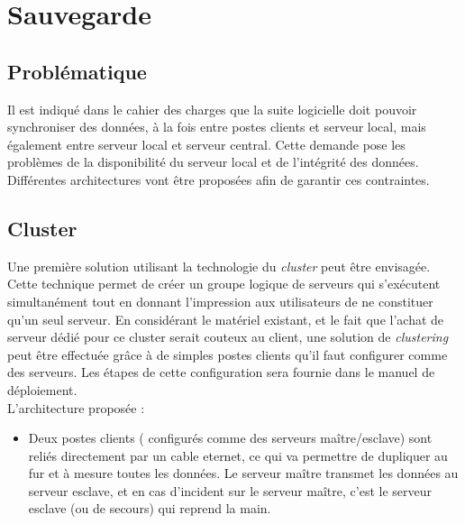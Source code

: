 \section{Sauvegarde}

% 

\subsection{Problématique}

Il est indiqué dans le cahier des charges que la suite logicielle doit pouvoir synchroniser des données, à la fois entre postes clients et serveur local, mais également entre serveur local et serveur central.
Cette demande pose les problèmes de la disponibilité du serveur local et de l'intégrité des données. Différentes architectures vont être proposées afin de garantir ces contraintes.

\subsection{Cluster}

Une première solution utilisant la technologie du \textit{cluster} peut être envisagée. Cette technique permet de créer un groupe logique de serveurs qui s'exécutent simultanément tout en donnant l'impression aux utilisateurs de ne constituer qu'un seul serveur.
En considérant le matériel existant, et le fait que l'achat de serveur dédié pour ce cluster serait couteux au client, une solution de \textit{clustering} peut être effectuée grâce à de simples postes clients qu'il faut configurer comme des serveurs. Les étapes de cette configuration sera fournie dans le manuel de déploiement.
\\
L'architecture proposée :
\begin{itemize}
	\item Deux postes clients ( configurés comme des serveurs maître/esclave) sont reliés directement par un cable eternet, ce qui va permettre de dupliquer au fur et à mesure toutes les données. Le serveur maître transmet les données au serveur esclave, et en cas d'incident sur le serveur maître, c'est le serveur esclave (ou de secours) qui reprend la main.
\end{itemize}

